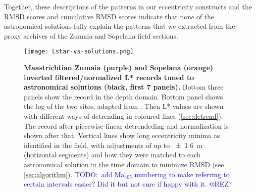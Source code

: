 \documentclass[draft]{agujournal2019}
\newcommand{\ma}[1]{Ma\(_{405}\)#1} %
\newcommand{\ijk}{\textcolor{blue}}
\begin{document}

Together, these descriptions of the patterns in our eccentricity constructs and the \gls{RMSD} scores and cumulative \gls{RMSD} scores indicate that none of the astronomical solutions fully explain the patterns that we extracted from the proxy archives of the Zumaia and Sopelana field sections.

\begin{figure}[htb]
  \centering
  \texttt{[image: Lstar-vs-solutions.png]}
  \caption{\label{fig:rolling-depth-age}
    \textbf{Maastrichtian Zumaia (purple) and Sopelana (orange) inverted filtered/normalized \gls{L*} records tuned to astronomical solutions (black, first 7 panels).}
    Bottom three panels show the record in the depth domain.
    Bottom panel shows the log of the two sites, adapted from .
    Then \gls{L*} values are shown with different ways of detrending in coloured lines (\cref{sec:detrend}).
    The record after piecewise-linear detrendeding and normalization is shown after that.
    Vertical lines show long eccentricity minima as identified in the field,
    with adjustments of up to \qty{\pm1.6}{\metre} (horizontal segments)
    and how they were matched to each astronomical solution in the time domain to minimize \gls{RMSD} (see \cref{sec:algorithm}).
    \ijk{TODO:\ add \ma{} numbering to make referring to certain intervals easier? Did it but not sure if happy with it. @REZ?}
    }
\end{figure}
\end{document}
